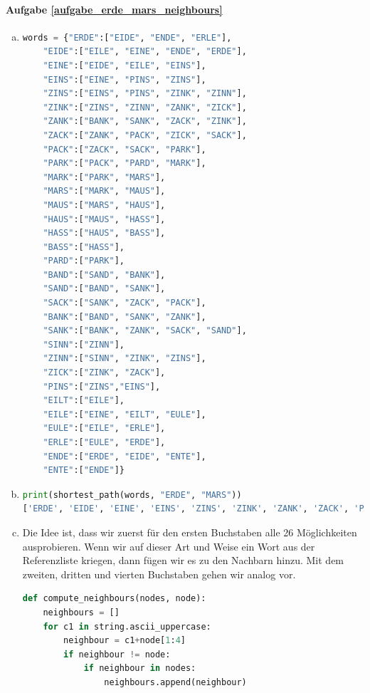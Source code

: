 \paragraph{Aufgabe \ref{aufgabe_erde_mars_neighbours}}
\begin{enumerate}[(a)]
    \item
    \begin{lstlisting}[language=Python]
words = {"ERDE":["EIDE", "ENDE", "ERLE"],
    "EIDE":["EILE", "EINE", "ENDE", "ERDE"],
    "EINE":["EIDE", "EILE", "EINS"],
    "EINS":["EINE", "PINS", "ZINS"],
    "ZINS":["EINS", "PINS", "ZINK", "ZINN"],
    "ZINK":["ZINS", "ZINN", "ZANK", "ZICK"],
    "ZANK":["BANK", "SANK", "ZACK", "ZINK"],
    "ZACK":["ZANK", "PACK", "ZICK", "SACK"],
    "PACK":["ZACK", "SACK", "PARK"],
    "PARK":["PACK", "PARD", "MARK"],
    "MARK":["PARK", "MARS"],
    "MARS":["MARK", "MAUS"],
    "MAUS":["MARS", "HAUS"],
    "HAUS":["MAUS", "HASS"],
    "HASS":["HAUS", "BASS"],
    "BASS":["HASS"],
    "PARD":["PARK"],
    "BAND":["SAND", "BANK"],
    "SAND":["BAND", "SANK"],
    "SACK":["SANK", "ZACK", "PACK"],
    "BANK":["BAND", "SANK", "ZANK"],
    "SANK":["BANK", "ZANK", "SACK", "SAND"],
    "SINN":["ZINN"],
    "ZINN":["SINN", "ZINK", "ZINS"],
    "ZICK":["ZINK", "ZACK"],
    "PINS":["ZINS","EINS"],
    "EILT":["EILE"],
    "EILE":["EINE", "EILT", "EULE"],
    "EULE":["EILE", "ERLE"],
    "ERLE":["EULE", "ERDE"],
    "ENDE":["ERDE", "EIDE", "ENTE"],
    "ENTE":["ENDE"]}
    \end{lstlisting}
    
    \item
    \begin{lstlisting}[language=Python]
print(shortest_path(words, "ERDE", "MARS"))
['ERDE', 'EIDE', 'EINE', 'EINS', 'ZINS', 'ZINK', 'ZANK', 'ZACK', 'PACK', 'PARK', 'MARK', 'MARS']
    \end{lstlisting}
    
    \item Die Idee ist, dass wir zuerst für den ersten Buchstaben alle 26 Möglichkeiten ausprobieren. Wenn wir auf dieser Art und Weise ein Wort aus der Referenzliste kriegen, dann fügen wir es zu den Nachbarn hinzu. Mit dem zweiten, dritten und vierten Buchstaben gehen wir analog vor.
    \begin{lstlisting}[language=Python]
def compute_neighbours(nodes, node):
    neighbours = []
    for c1 in string.ascii_uppercase:
        neighbour = c1+node[1:4]
        if neighbour != node:
            if neighbour in nodes:
                neighbours.append(neighbour)
                

\end{lstlisting}
\end{enumerate}
